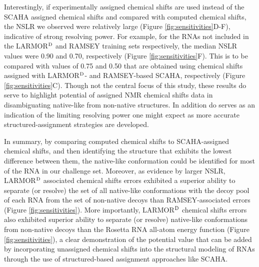 \documentclass[journal=jcisd8,manuscript=article,layout=onecolumn]{achemso}
\begin{document}
Interestingly, if experimentally assigned chemical shifts are used instead of the SCAHA assigned chemical shifts and compared with computed chemical shifts, the NSLR we observed were relatively large (Figure  \ref{fig:sensitivities}D-F), indicative of strong resolving power. For example, for the RNAs not included in the LARMOR$^{\rm D}$ and RAMSEY training sets respectively, the median NSLR values were 0.90 and 0.70, respectively (Figure  \ref{fig:sensitivities}F). This is to be compared with values of 0.75 and 0.50 that are obtained using chemical shifts assigned with LARMOR$^{\rm D}$- and RAMSEY-based SCAHA, respectively (Figure  \ref{fig:sensitivities}C). Though not the central focus of this study, these results do serve to highlight potential of assigned NMR chemical shifts data in disambiguating native-like from non-native structures. In addition do serves as an indication of the limiting resolving power one might expect as more accurate structured-assignment strategies are developed.


In summary, by comparing computed chemical shifts to SCAHA-assigned chemical shifts, and then identifying the structure that exhibits the lowest difference between them, the native-like conformation could be identified for most of the RNA in our challenge set. Moreover, as evidence by larger NSLR, LARMOR$^{\rm D}$ associated chemical shifts errors exhibited a superior ability to separate (or resolve) the set of all native-like conformations with the decoy pool of each RNA from the set of non-native decoys than RAMSEY-associated errors (Figure \ref{fig:sensitivities}). More importantly, LARMOR$^{\rm D}$ chemical shifts errors also exhibited superior ability to separate (or resolve) native-like conformations from non-native decoys than the Rosetta RNA all-atom energy function (Figure \ref{fig:sensitivities}), a clear demonstration of the potential value that can be added by incorporating unassigned chemical shifts into the structural modeling of RNAs through the use of structured-based assignment approaches like SCAHA.
\end{document}
